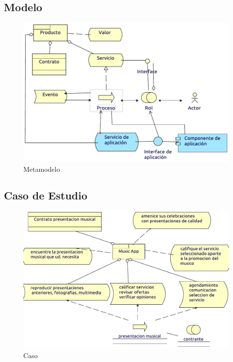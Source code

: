 \subsection{Modelo}
\begin{figure}[h!]
	\centering
	\includegraphics[width=\linewidth]{Arquitectura/Negocio/imgs/ProductoMetamodelo.pdf}
	\caption{Metamodelo}
\end{figure}
\newpage
\subsection{Caso de Estudio}

\begin{figure}[h!]
	\centering
	\includegraphics[width=\linewidth]{Arquitectura/Negocio/imgs/Producto.pdf}
	\caption{Caso}
\end{figure}
\newpage

